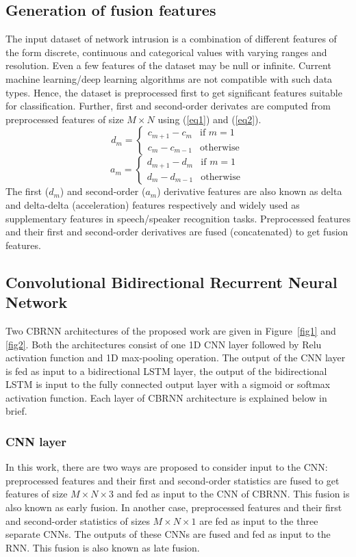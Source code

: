 \documentclass[review]{elsarticle}
\begin{document}
\subsection{Generation of fusion features}
The input dataset of network intrusion is a combination of different features of the form discrete, continuous and categorical values with varying ranges and resolution. Even a few features of the dataset may be null or infinite. Current machine learning/deep learning algorithms are not compatible with such data types. Hence, the dataset is preprocessed first to get significant features suitable for classification. Further, first and second-order derivates are computed from preprocessed features of size $M\times N$ using (\ref{eq1}) and (\ref{eq2}).
\begin{equation}
d_{m} =
\begin{cases}
c_{m+1}-c_{m} & \text{if $m=1$ }\\
c_{m}-c_{m-1} & \text{otherwise}
\end{cases}   
\label{eq1}    
\end{equation}
\begin{equation}
a_{m} =
\begin{cases}
d_{m+1}-d_{m} & \text{if $m=1$ }\\
d_{m}-d_{m-1} & \text{otherwise}
\end{cases}   
\label{eq2}    
\end{equation}
The first ($d_m$) and second-order ($a_m$) derivative features are also known as delta and delta-delta (acceleration) features respectively and widely used as supplementary features in speech/speaker recognition tasks. Preprocessed features and their first and second-order derivatives are fused (concatenated) to get fusion features.
\subsection{Convolutional Bidirectional Recurrent Neural Network}
Two CBRNN architectures of the proposed work are given in Figure~\ref{fig1} and \ref{fig2}. Both the architectures consist of one 1D CNN layer followed by Relu activation function and 1D max-pooling operation. The output of the CNN layer is fed as input to a bidirectional LSTM layer, the output of the bidirectional LSTM is input to the fully connected output layer with a sigmoid or softmax activation function. 
Each layer of CBRNN architecture is explained below in brief.
\subsubsection{CNN layer}
In this work, there are two ways are proposed to consider input to the CNN: preprocessed features and their first and second-order statistics are fused to get features of size $M\times N\times 3$ and fed as input to the CNN of CBRNN. This fusion is also known as early fusion. In another case, preprocessed features and their first and second-order statistics of sizes $M\times N\times 1$ are fed as input to the three separate CNNs. The outputs of these CNNs are fused and fed as input to the RNN. This fusion is also known as late fusion. 
\end{document}
